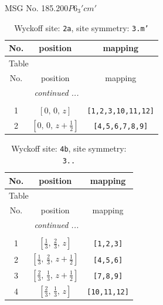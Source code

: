 \documentclass[fleqn,8pt]{jsarticle}
\begin{document}
\setcounter{MaxMatrixCols}{32}

\renewcommand{\tablename}{Table~}
\renewcommand{\figurename}{Figure~}
\begin{center}
\LARGE
MSG No. 185.200\quad$P6_{3}'cm'$
\end{center}
\renewcommand{\arraystretch}{1.2}
\begin{longtable}{ccc}
\caption{Wyckoff site: {\tt 2a}, site symmetry: {\tt 3.m'}}
 \\
 \hline \hline
No. & position & mapping \\ \hline \endfirsthead

\multicolumn{2}{l}{\tablename\ \thetable{}} \\
 \hline \hline
No. & position & mapping \\ \hline \endhead

 \hline \hline
\multicolumn{2}{r}{\footnotesize\it continued ...} \\ \endfoot

 \hline \hline
\multicolumn{2}{r}{} \\ \endlastfoot

1 & $\left[ 0,\, 0,\, z \right]$ & {\tt [1,2,3,10,11,12]} \\ \hline
2 & $\left[ 0,\, 0,\, z + \frac{1}{2} \right]$ & {\tt [4,5,6,7,8,9]} \\
\end{longtable}
\renewcommand{\arraystretch}{1.2}
\begin{longtable}{ccc}
\caption{Wyckoff site: {\tt 4b}, site symmetry: {\tt 3..}}
 \\
 \hline \hline
No. & position & mapping \\ \hline \endfirsthead

\multicolumn{2}{l}{\tablename\ \thetable{}} \\
 \hline \hline
No. & position & mapping \\ \hline \endhead

 \hline \hline
\multicolumn{2}{r}{\footnotesize\it continued ...} \\ \endfoot

 \hline \hline
\multicolumn{2}{r}{} \\ \endlastfoot

1 & $\left[ \frac{1}{3},\, \frac{2}{3},\, z \right]$ & {\tt [1,2,3]} \\ \hline
2 & $\left[ \frac{1}{3},\, \frac{2}{3},\, z + \frac{1}{2} \right]$ & {\tt [4,5,6]} \\ \hline
3 & $\left[ \frac{2}{3},\, \frac{1}{3},\, z + \frac{1}{2} \right]$ & {\tt [7,8,9]} \\ \hline
4 & $\left[ \frac{2}{3},\, \frac{1}{3},\, z \right]$ & {\tt [10,11,12]} \\
\end{longtable}
\end{document}
